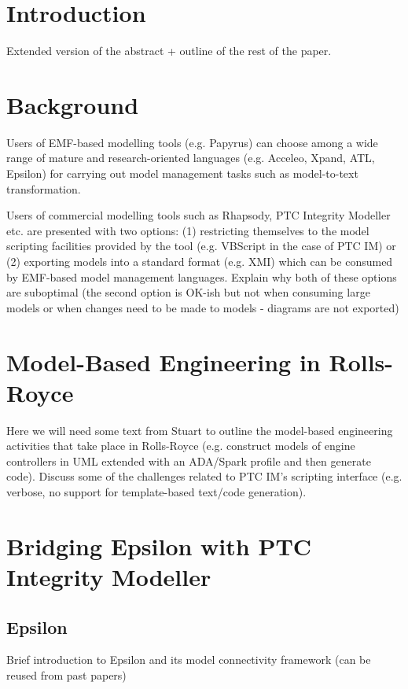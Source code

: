 \section{Introduction}

Extended version of the abstract + outline of the rest of the paper.

\section{Background}

Users of EMF-based modelling tools (e.g. Papyrus) can choose among a wide range of mature and research-oriented languages (e.g. Acceleo, Xpand, ATL, Epsilon) for carrying out model management tasks such as model-to-text transformation.

Users of commercial modelling tools such as Rhapsody, PTC Integrity Modeller etc. are presented with two options: (1) restricting themselves to the model scripting facilities provided by the tool (e.g. VBScript in the case of PTC IM) or (2) exporting models into a standard format (e.g. XMI) which can be consumed by EMF-based model management languages. Explain why both of these options are suboptimal (the second option is OK-ish but not when consuming large models or when changes need to be made to models - diagrams are not exported)

\section{Model-Based Engineering in Rolls-Royce}

Here we will need some text from Stuart to outline the model-based engineering activities that take place in Rolls-Royce (e.g. construct  models of engine controllers in UML extended with an ADA/Spark profile and then generate code). Discuss some of the challenges related to PTC IM's scripting interface (e.g. verbose, no support for template-based text/code generation).

\section{Bridging Epsilon with PTC Integrity Modeller}

\subsection{Epsilon}
Brief introduction to Epsilon and its model connectivity framework (can be reused from past papers)

